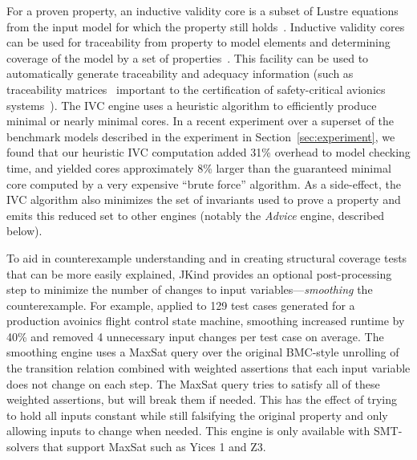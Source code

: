 \documentclass{llncs}
\newcommand{\jkind}{{\sc JKind}\xspace}
\newcommand{\lustre}{{\sc Lustre}\xspace}
\newcommand{\yices}{{\sc Yices}\xspace}
\newcommand{\zthree}{{\sc Z3}\xspace}
\renewcommand{\paragraph}[1]{\vspace{5pt}\noindent {\bf #1}}
\begin{document}
\paragraph{Inductive Validity Cores (IVC).} For a proven property, an inductive validity core is a subset of \lustre equations from the input model for which the property still
holds~\cite{ghassabani2016fse,Ghass17AllIVCs}.  Inductive validity cores can be used for traceability from property to model elements and determining coverage of the model by a set of properties~\cite{Ghass17Cov}.  This facility can be used to automatically generate traceability and adequacy information (such as traceability matrices~\cite{fifarek2017nfm} important to the certification of safety-critical avionics systems~\cite{DO178C}).
The IVC engine uses a heuristic algorithm to efficiently produce minimal or nearly minimal cores.   In a recent experiment over a superset of the benchmark models described in the experiment in Section~\ref{sec:experiment}, we found that our heuristic IVC computation added 31\% overhead to model checking time, and yielded cores approximately 8\% larger than the guaranteed minimal core computed by a very expensive ``brute force'' algorithm.  As a side-effect, the IVC algorithm also minimizes the set of invariants used to prove a property and emits this reduced set to other engines (notably the {\em Advice} engine, described below).


\paragraph{Smoothing.}  To aid in counterexample understanding and in
creating structural coverage tests that can be more easily explained,
\jkind provides an optional post-processing step to minimize the
number of changes to input variables---{\em smoothing} the
counterexample.  For example, applied to 129 test cases generated for
a production avoinics flight control state machine, smoothing
increased runtime by 40\% and removed 4 unnecessary input changes per
test case on average.  The smoothing engine uses a {\sc MaxSat} query
over the original BMC-style unrolling of the transition relation
combined with weighted assertions that each input variable does not
change on each step. The {\sc MaxSat} query tries to satisfy all of
these weighted assertions, but will break them if needed. This has the
effect of trying to hold all inputs constant while still falsifying
the original property and only allowing inputs to change when
needed. This engine is only available with SMT-solvers that support
{\sc MaxSat} such as \yices 1 and \zthree.
\end{document}
